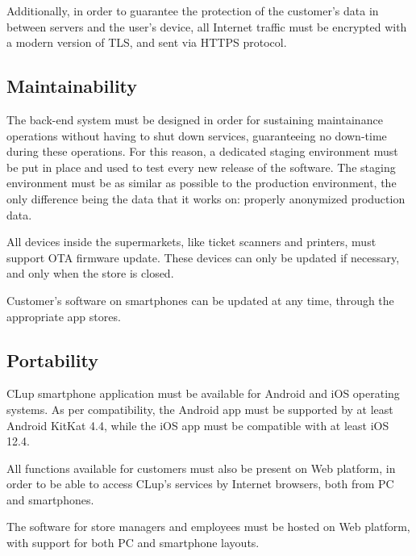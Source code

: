 \documentclass[../../main.tex]{subfiles}
\begin{document}
	Additionally, in order to guarantee the protection of the customer's data in between servers and the 
	user's device, all Internet traffic must be encrypted with a modern version of TLS, and sent via HTTPS protocol.


	\subsection{Maintainability}

	The back-end system must be designed in order for sustaining maintainance operations without having to 
	shut down services, guaranteeing no down-time during these operations. For this reason, a dedicated staging environment must be put in place and used to test every new release of the software. The staging environment must be as similar as possible to the production environment, the only difference being the data that it works on: properly anonymized production data.

	All devices inside the supermarkets, like ticket scanners and printers, must support OTA firmware update. These devices can only be updated if necessary, and only when the store is closed.

	Customer's software on smartphones can be updated at any time, through the appropriate app stores.

	\subsection{Portability}

	CLup smartphone application must be available for Android and iOS operating systems. As per compatibility, the Android app must be supported by at least Android KitKat 4.4, while the iOS app must be compatible with at least iOS 12.4.

	All functions available for customers must also be present on Web platform, in order to be able to access 
	CLup's services by Internet browsers, both from PC and smartphones.

	The software for store managers and employees must be hosted on Web platform, with support for both PC and smartphone layouts.

	
\end{document}

